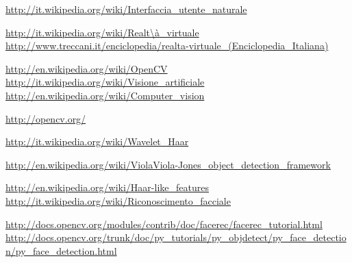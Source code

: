\begin{thebibliography}{10}



  

 \url{http://it.wikipedia.org/wiki/Interfaccia_utente_naturale}



\url{http://it.wikipedia.org/wiki/Realt\à_virtuale}
\url{http://www.treccani.it/enciclopedia/realta-virtuale_(Enciclopedia_Italiana)}




\url{http://en.wikipedia.org/wiki/OpenCV}
%
\url{http://it.wikipedia.org/wiki/Visione_artificiale}
\url{http://en.wikipedia.org/wiki/Computer_vision}

 \url{http://opencv.org/}

\url{http://it.wikipedia.org/wiki/Wavelet_Haar}

 \url{http://en.wikipedia.org/wiki/ViolaViola-Jones_object_detection_framework}

 \url{http://en.wikipedia.org/wiki/Haar-like_features}
 \url{http://it.wikipedia.org/wiki/Riconoscimento_facciale}


 \url{http://docs.opencv.org/modules/contrib/doc/facerec/facerec_tutorial.html}
 \url{http://docs.opencv.org/trunk/doc/py_tutorials/py_objdetect/py_face_detection/py_face_detection.html}
%






\end{thebibliography}
